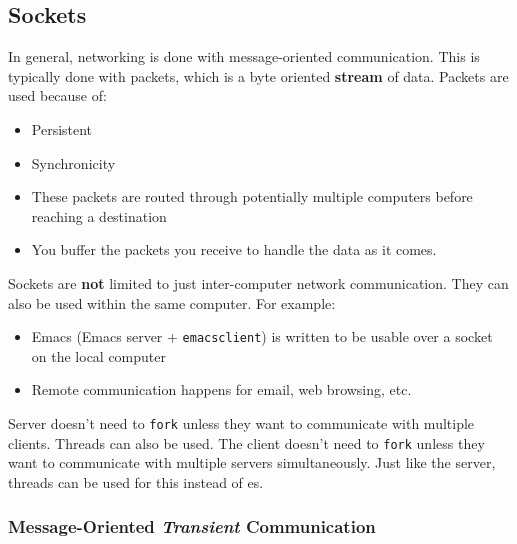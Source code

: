 \subsection{Sockets}\label{subsec:Sockets}
In general, networking is done with message-oriented communication.
This is typically done with packets, which is a byte oriented \textbf{stream} of data.
Packets are used because of:
\begin{itemize}[noitemsep]
\item Persistent
\item Synchronicity
\item These packets are routed through potentially multiple computers before reaching a destination
\item You buffer the packets you receive to handle the data as it comes.
\end{itemize}

Sockets are \textbf{not} limited to just inter-computer network communication.
They can also be used within the same computer.
For example:
\begin{itemize}[noitemsep]
\item Emacs (Emacs server + \texttt{emacsclient}) is written to be usable over a socket on the local computer
\item Remote communication happens for email, web browsing, etc.
\end{itemize}

Server doesn't need to \texttt{fork} unless they want to communicate with multiple clients.
Threads can also be used.
The client doesn't need to \texttt{fork} unless they want to communicate with multiple servers simultaneously.
Just like the server, threads can be used for this instead of es.

\subsubsection{Message-Oriented \emph{Transient} Communication}\label{subsubsec:Transient_Communication}


